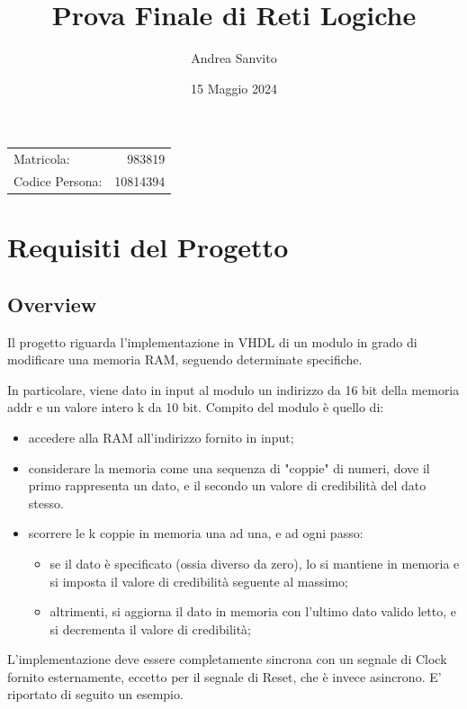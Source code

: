\documentclass{article}
\begin{document}
\title{Prova Finale di Reti Logiche}
\author{Andrea Sanvito}
\date{15 Maggio 2024}
\maketitle
\noindent
\begin{center}
\begin{tabular}{l r}
Matricola: & 983819 \\
Codice Persona: & 10814394 \\
\end{tabular}
\end{center}
\vspace*{3cm}
\section{Requisiti del Progetto}
\subsection{Overview}
Il progetto riguarda l'implementazione in VHDL di un modulo in grado di modificare una memoria RAM, seguendo determinate specifiche.

In particolare, viene dato in input al modulo un indirizzo da 16 bit della memoria addr e un valore intero k da 10 bit.
Compito del modulo è quello di:
\begin{itemize}
    \item accedere alla RAM all'indirizzo fornito in input;
    \item considerare la memoria come una sequenza di "coppie" di numeri, dove il primo rappresenta un dato, e il secondo un
    valore di credibilità del dato stesso.
    \item scorrere le k coppie in memoria una ad una, e ad ogni passo:
    \begin{itemize}
        \item se il dato è specificato (ossia diverso da zero), lo si mantiene in memoria e si imposta il valore di credibilità seguente al massimo;
        \item altrimenti, si aggiorna il dato in memoria con l'ultimo dato valido letto, e si decrementa il valore di credibilità;
    \end{itemize}
\end{itemize}

L'implementazione deve essere completamente sincrona con un segnale di Clock fornito esternamente, eccetto per il segnale di Reset, che è invece asincrono.
E' riportato di seguito un esempio.
\end{document}
